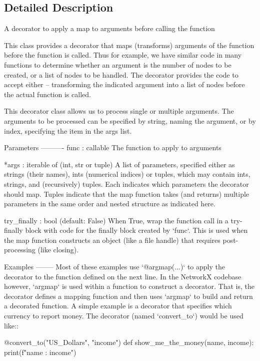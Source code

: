 \subsection{Detailed Description}
\begin{DoxyVerb}A decorator to apply a map to arguments before calling the function

This class provides a decorator that maps (transforms) arguments of the function
before the function is called. Thus for example, we have similar code
in many functions to determine whether an argument is the number of nodes
to be created, or a list of nodes to be handled. The decorator provides
the code to accept either -- transforming the indicated argument into a
list of nodes before the actual function is called.

This decorator class allows us to process single or multiple arguments.
The arguments to be processed can be specified by string, naming the argument,
or by index, specifying the item in the args list.

Parameters
----------
func : callable
    The function to apply to arguments

*args : iterable of (int, str or tuple)
    A list of parameters, specified either as strings (their names), ints
    (numerical indices) or tuples, which may contain ints, strings, and
    (recursively) tuples. Each indicates which parameters the decorator
    should map. Tuples indicate that the map function takes (and returns)
    multiple parameters in the same order and nested structure as indicated
    here.

try_finally : bool (default: False)
    When True, wrap the function call in a try-finally block with code
    for the finally block created by `func`. This is used when the map
    function constructs an object (like a file handle) that requires
    post-processing (like closing).

Examples
--------
Most of these examples use `@argmap(...)` to apply the decorator to
the function defined on the next line.
In the NetworkX codebase however, `argmap` is used within a function to
construct a decorator. That is, the decorator defines a mapping function
and then uses `argmap` to build and return a decorated function.
A simple example is a decorator that specifies which currency to report money.
The decorator (named `convert_to`) would be used like::

    @convert_to("US_Dollars", "income")
    def show_me_the_money(name, income):
        print(f"{name} : {income}")


\end{DoxyVerb}
